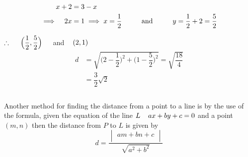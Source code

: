 \documentclass[11pt,a4paper]{article}
\begin{document}
\begin{align*}
x + 2 & = 3 - x\\
\implies\hspace{0.3cm} 2x & = 1 \implies x = \dfrac{1}{2}\hspace{1cm}\text{and}\hspace{1cm} y = \dfrac{1}{2} + 2 = \dfrac{5}{2}
\end{align*}


$\therefore\hspace{0.5cm} \Big(\dfrac{1}{2},\dfrac{5}{2}\Big)\hspace{0.4cm}$ and $\hspace{0.3cm} (2,1)$
\begin{align*}
d & = \sqrt{\Bigg(2 - \dfrac{1}{2}\Bigg)^2 + \Bigg(1 - \dfrac{5}{2}\Bigg)^2} = \sqrt{\dfrac{18}{4}}\\
& = \dfrac{3}{2}\sqrt{2}\\\\
\end{align*}






Another method for finding the distance from a point to a line is by the use of the formula, given the equation of the line \hspace{0.2cm}$L\hspace{0.2cm}\hspace{0.2cm} ax + by + c = 0$\hspace{0.2cm}
and a point $(m,n)$ then the distance from $P$ to $L$ is given by $$ d = \dfrac{
\begin{vmatrix}
am + bn + c\\
\end{vmatrix}
}{\sqrt{a^2 + b^2}}$$\\\\
\end{document}
